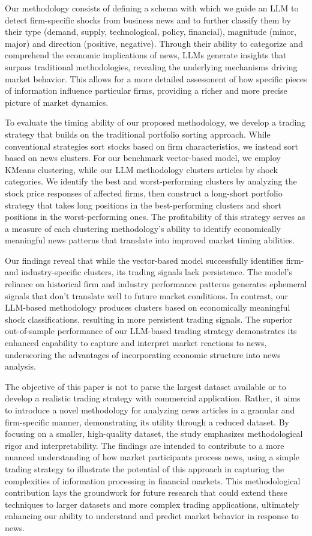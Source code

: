 Our methodology consists of defining a schema with which we guide an LLM to detect 
firm-specific shocks from business news and to further classify them by their type (demand, supply, technological, policy, financial), magnitude (minor, major) and direction (positive, negative). Through their ability to categorize and comprehend the economic implications of news, LLMs generate insights that surpass traditional methodologies, revealing the underlying mechanisms driving market behavior.
This allows for a more detailed assessment of how specific pieces of information influence particular firms, providing a richer and more precise picture of market dynamics.


To evaluate the timing ability of our proposed methodology, we develop a trading strategy that builds on the traditional portfolio sorting approach. While conventional strategies sort stocks based on firm characteristics, we instead sort based on news clusters. For our benchmark vector-based model, we employ KMeans clustering, while our LLM methodology clusters articles by shock categories. We identify the best and worst-performing clusters by analyzing the stock price responses of affected firms, then construct a long-short portfolio strategy that takes long positions in the best-performing clusters and short positions in the worst-performing ones. The profitability of this strategy serves as a measure of each clustering methodology's ability to identify economically meaningful news patterns that translate into improved market timing abilities.


Our findings reveal that while the vector-based model successfully identifies firm- and industry-specific clusters, its trading signals lack persistence. The model's reliance on historical firm and industry performance patterns generates ephemeral signals that don't translate well to future market conditions. In contrast, our LLM-based methodology produces clusters based on economically meaningful shock classifications, resulting in more persistent trading signals. The superior out-of-sample performance of our LLM-based trading strategy demonstrates its enhanced capability to capture and interpret market reactions to news, underscoring the advantages of incorporating economic structure into news analysis.


The objective of this paper is not to parse the largest dataset available or to develop a realistic trading strategy with commercial application. Rather, it aims to introduce a novel methodology for analyzing news articles in a granular and firm-specific manner, demonstrating its utility through a reduced dataset. By focusing on a smaller, high-quality dataset, the study emphasizes methodological rigor and interpretability. The findings are intended to contribute to a more nuanced understanding of how market participants process news, using a simple trading strategy to illustrate the potential of this approach in capturing the complexities of information processing in financial markets. This methodological contribution lays the groundwork for future research that could extend these techniques to larger datasets and more complex trading applications, ultimately enhancing our ability to understand and predict market behavior in response to news.

